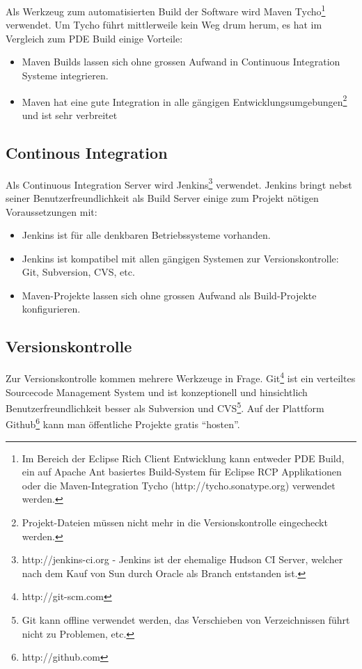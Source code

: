 Als Werkzeug zum automatisierten Build der Software wird Maven Tycho\footnote{Im Bereich der Eclipse Rich Client Entwicklung kann entweder PDE Build, ein auf Apache Ant basiertes Build-System für Eclipse RCP Applikationen\cite{vogelZapfPdeBuild} oder die Maven-Integration Tycho (http://tycho.sonatype.org) verwendet werden.} verwendet. Um Tycho führt mittlerweile kein Weg drum herum, es hat im Vergleich zum PDE Build einige Vorteile:
\begin{itemize}
	\item Maven Builds lassen sich ohne grossen Aufwand in Continuous Integration Systeme integrieren.
	\item Maven hat eine gute Integration in alle gängigen Entwicklungsumgebungen\footnote{Projekt-Dateien müssen nicht mehr in die Versionskontrolle eingecheckt werden.} und ist sehr verbreitet
\end{itemize}

\subsection{Continous Integration}
Als Continuous Integration Server wird Jenkins\footnote{http://jenkins-ci.org - Jenkins ist der ehemalige Hudson CI Server, welcher nach dem Kauf von Sun durch Oracle als Branch entstanden ist.} verwendet. Jenkins bringt nebst seiner Benutzerfreundlichkeit als Build Server einige zum Projekt nötigen Voraussetzungen mit:
\begin{itemize}
	\item Jenkins ist für alle denkbaren Betriebssysteme vorhanden.
	\item Jenkins ist kompatibel mit allen gängigen Systemen zur Versionskontrolle: Git, Subversion, CVS, etc.
	\item Maven-Projekte lassen sich ohne grossen Aufwand als Build-Projekte konfigurieren.
\end{itemize}

\subsection{Versionskontrolle}
Zur Versionskontrolle kommen mehrere Werkzeuge in Frage. Git\footnote{http://git-scm.com} ist ein verteiltes Sourcecode Management System und ist konzeptionell und hinsichtlich Benutzerfreundlichkeit besser als Subversion und CVS\footnote{Git kann offline verwendet werden, das Verschieben von Verzeichnissen führt nicht zu Problemen, etc.}. Auf der Plattform Github\footnote{http://github.com} kann man öffentliche Projekte gratis ``hosten''.

